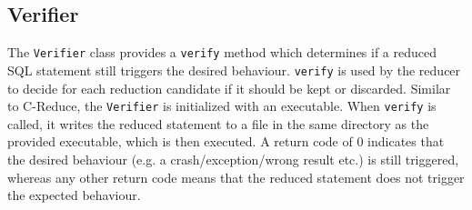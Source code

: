 \subsection{Verifier}
The \texttt{Verifier} class provides a \texttt{verify} method which determines if a reduced SQL statement still triggers the desired behaviour. \texttt{verify} is used by the reducer to decide for each reduction candidate if it should be kept or discarded. Similar to C-Reduce, the \texttt{Verifier} is initialized with an executable. When \texttt{verify} is called, it writes the reduced statement to a file in the same directory as the provided executable, which is then executed. A return code of 0 indicates that the desired behaviour (e.g. a crash/exception/wrong result etc.) is still triggered, whereas any other return code means that the reduced statement does not trigger the expected behaviour.
